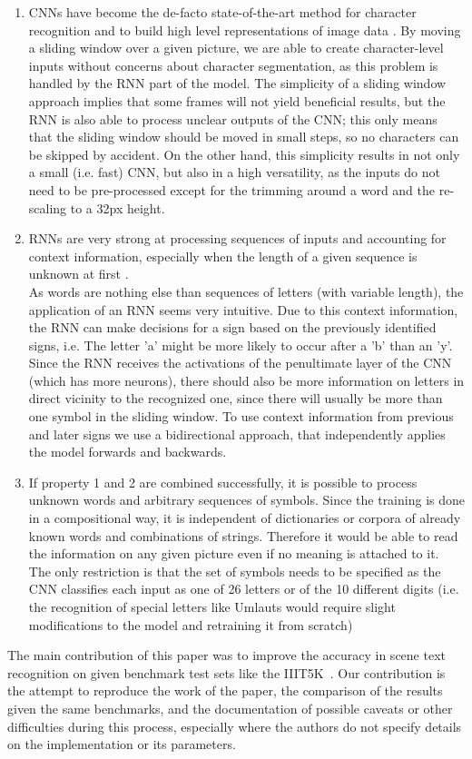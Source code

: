 \documentclass{utue} %
\begin{document}
\begin{enumerate}
	\item CNNs have become the de-facto state-of-the-art method for character recognition and to build high level representations of image data \cite{cnn1} \cite{cnn2} \cite{cnn3}.
	By moving a sliding window over a given picture, we are able to create character-level inputs without concerns about character segmentation, as this problem is handled by the RNN part of the model. The simplicity of a sliding window approach implies that some frames will not yield beneficial results, but the RNN is also able to process unclear outputs of the CNN; this only means that the sliding window should be moved in small steps, so no characters can be skipped by accident. On the other hand, this simplicity results in not only a small (i.e. fast) CNN, but also in a high versatility, as the inputs do not need to be pre-processed except for the trimming around a word and the re-scaling to a 32px height.
	\item RNNs are very strong at processing sequences of inputs and accounting for context information, especially when the length of a given sequence is unknown at first \cite{rnn1} \cite{rnn2}.\\
	As words are nothing else than sequences of letters (with variable length), the application of an RNN seems very intuitive. Due to this context information, the RNN can make decisions for a sign based on the previously identified signs, i.e. The letter 'a' might be more likely to occur after a 'b' than an 'y'. Since the RNN receives the activations of the penultimate layer of the CNN (which has more neurons), there should also be more information on letters in direct vicinity to the recognized one, since there will usually be more than one symbol in the sliding window. To use context information from previous and later signs we use a bidirectional approach, that independently applies the model forwards and backwards. 
	\item If property 1 and 2 are combined successfully, it is possible to process unknown words and arbitrary sequences of symbols. Since the training is done in a compositional way, it is independent of dictionaries or corpora of already known words and combinations of strings. Therefore it would be able to read the information on any given picture even if no meaning is attached to it. The only restriction is that the set of symbols needs to be specified as the CNN classifies each input as one of 26 letters or of the 10 different digits (i.e. the recognition of special letters like Umlauts would require slight modifications to the model and retraining it from scratch)
\end{enumerate}
The main contribution of this paper was to improve the accuracy in scene text recognition on given benchmark test sets like the IIIT5K~\cite{iiit5k}.
Our contribution is the attempt to reproduce the work of the paper, the comparison of the results given the same benchmarks, and the documentation of possible caveats or other difficulties during this process, especially where the authors do not specify details on the implementation or its parameters.
\end{document}
